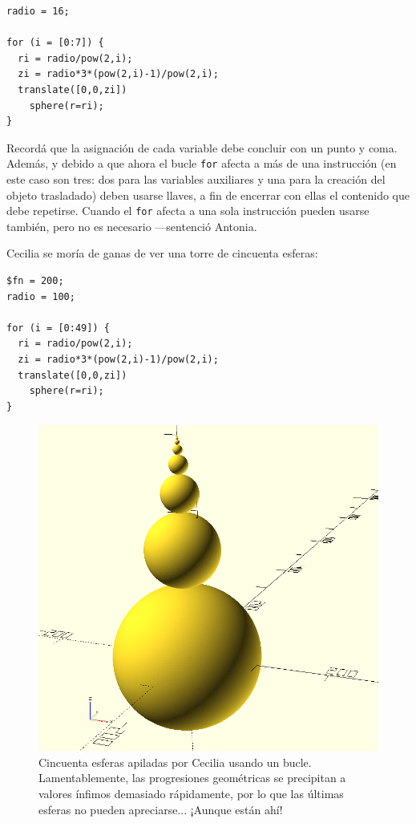     \begin{lstlisting}
radio = 16;
      
for (i = [0:7]) {
  ri = radio/pow(2,i);
  zi = radio*3*(pow(2,i)-1)/pow(2,i);
  translate([0,0,zi])
    sphere(r=ri);
}
    \end{lstlisting}

    \guillemotright Recordá que la asignación de cada variable debe
    concluir con un punto y coma. Además, y debido a que ahora el
    bucle \lstinline!for! afecta a más de una instrucción (en este
    caso son tres: dos para las variables auxiliares y una para la
    creación del objeto trasladado) deben usarse llaves, a fin de
    encerrar con ellas el contenido que debe repetirse. Cuando el
    \lstinline!for! afecta a una sola instrucción pueden usarse
    también, pero no es necesario ---sentenció Antonia.

    Cecilia se moría de ganas de ver una torre de cincuenta
    esferas:


    \begin{lstlisting}
$fn = 200;
radio = 100;

for (i = [0:49]) {
  ri = radio/pow(2,i);
  zi = radio*3*(pow(2,i)-1)/pow(2,i);
  translate([0,0,zi])
    sphere(r=ri);
}
    \end{lstlisting}%



\begin{figure}[ht]
      \centering
      \includegraphics[width=.65\textwidth]{imagenes/50-esferas}      
      \caption{Cincuenta esferas apiladas por Cecilia usando un
        bucle. Lamentablemente, las progresiones geométricas se
        precipitan a valores ínfimos demasiado rápidamente, por lo que
        las últimas esferas no pueden apreciarse... ¡Aunque están ahí!
      }
      \label{fig:50-esferas}
    \end{figure}


